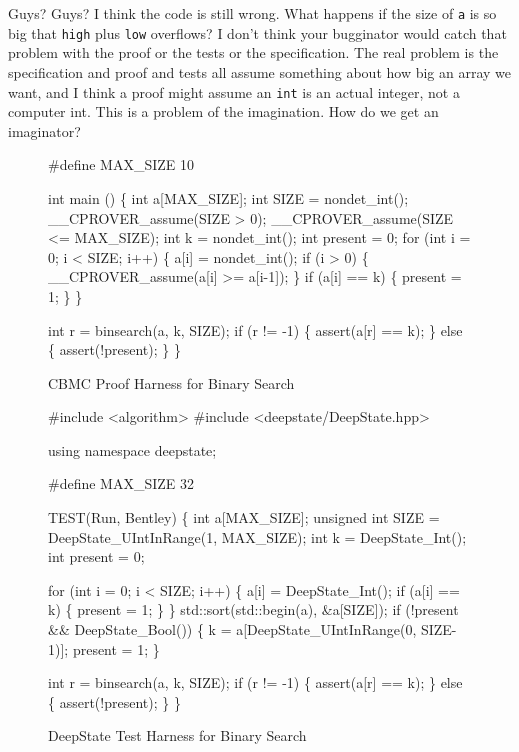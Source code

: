 \documentclass[sigplan]{acmart}
\begin{document}
\vspace{0.1in}

  Guys?  Guys?  I think the code is still
wrong.  What happens if the size of {\tt a} is so big that {\tt high}
plus {\tt low} overflows?  I don't think your bugginator would catch
that problem with the proof or the tests or the specification.  The
real problem is the specification and proof and tests all assume
something about how big an array we want, and I think a proof might
assume an {\tt int} is an actual integer, not a computer int.  This is a problem
of the imagination.  How do we get an imaginator?


\begin{figure}
  {\scriptsize
  \begin{code}
\#define MAX\_SIZE 10

int main () \{
  int a[MAX\_SIZE];
  int SIZE = nondet\_int();
  \_\_CPROVER\_assume(SIZE > 0);
  \_\_CPROVER\_assume(SIZE <= MAX\_SIZE);
  int k = nondet\_int();
  int present = 0;
  for (int i = 0; i < SIZE; i++) \{
    a[i] = nondet\_int();
    if (i > 0) \{
      \_\_CPROVER\_assume(a[i] >= a[i-1]);
    \}
    if (a[i] == k) \{
      present = 1;
    \}
  \}

  int r = binsearch(a, k, SIZE);
  if (r != -1) \{
    assert(a[r] == k);
  \} else \{
    assert(!present);
  \}
  \}
\end{code}
}
\caption{CBMC Proof Harness for Binary Search}
\label{fig:cbmc}
\end{figure}


\begin{figure}
{\scriptsize
  \begin{code}
\#include <algorithm>
\#include <deepstate/DeepState.hpp>

using namespace deepstate;

\#define MAX\_SIZE 32

TEST(Run, Bentley) \{
  int a[MAX\_SIZE];
  unsigned int SIZE = DeepState\_UIntInRange(1, MAX\_SIZE);
  int k = DeepState\_Int();
  int present = 0;

  for (int i = 0; i < SIZE; i++) \{
    a[i] = DeepState\_Int();
    if (a[i] == k) \{
      present = 1;
    \}
  \}
  std::sort(std::begin(a), \&a[SIZE]);
  if (!present \&\& DeepState\_Bool()) \{
    k = a[DeepState\_UIntInRange(0, SIZE-1)];
    present = 1;
  \}

  int r = binsearch(a, k, SIZE);
  if (r != -1) \{
    assert(a[r] == k);
  \} else \{
    assert(!present);
  \}
\}
\end{code}
}
\caption{DeepState Test Harness for Binary Search}
\label{fig:deepstate}
\end{figure}
\end{document}
